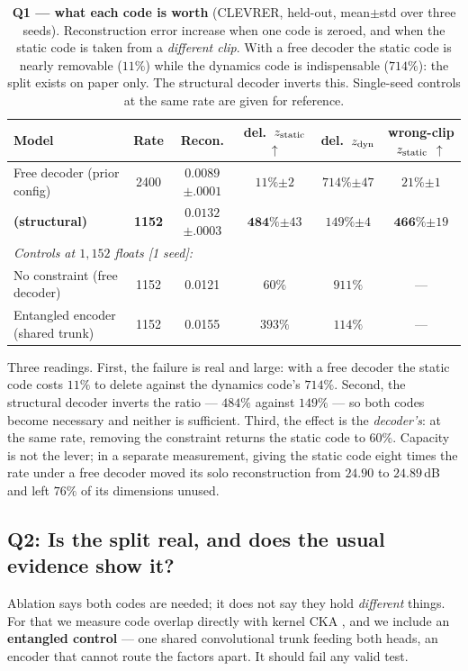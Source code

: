 \begin{table}[t]
\centering\small
\caption{\textbf{Q1 --- what each code is worth} (CLEVRER, held-out, mean$\pm$std over
three seeds). Reconstruction error increase when one code is zeroed, and when the static
code is taken from a \emph{different clip}. With a free decoder the static code is
nearly removable ($11\%$) while the dynamics code is indispensable ($714\%$): the split
exists on paper only. The structural decoder inverts this. Single-seed controls at the
same rate are given for reference.}
\label{tab:ablate}
\begin{tabular}{lccccc}
\toprule
Model & Rate & Recon. & del.\ $z_{\mathrm{static}}$ $\uparrow$ & del.\ $z_{\mathrm{dyn}}$ & wrong-clip $z_{\mathrm{static}}$ $\uparrow$ \\
\midrule
Free decoder (prior config) & 2400 & $0.0089${\tiny$\pm.0001$} & $11\%${\tiny$\pm2$} & $714\%${\tiny$\pm47$} & $21\%${\tiny$\pm1$} \\
\textbf{\method{} (structural)} & \textbf{1152} & $0.0132${\tiny$\pm.0003$} & $\mathbf{484\%}${\tiny$\pm43$} & $149\%${\tiny$\pm4$} & $\mathbf{466\%}${\tiny$\pm19$} \\
\midrule
\multicolumn{6}{l}{\emph{Controls at $1{,}152$ floats [1 seed]:}} \\
No constraint (free decoder) & 1152 & 0.0121 & $60\%$ & $911\%$ & --- \\
Entangled encoder (shared trunk) & 1152 & 0.0155 & $393\%$ & $114\%$ & --- \\
\bottomrule
\end{tabular}
\end{table}

Three readings. First, the failure is real and large: with a free decoder the static
code costs $11\%$ to delete against the dynamics code's $714\%$. Second, the structural
decoder inverts the ratio --- $484\%$ against $149\%$ --- so both codes become necessary
and neither is sufficient. Third, the effect is the \emph{decoder's}: at the same rate,
removing the constraint returns the static code to $60\%$. Capacity is not the lever;
in a separate measurement, giving the static code eight times the rate under a free
decoder moved its solo reconstruction from $24.90$ to $24.89$\,dB and left $76\%$ of
its dimensions unused.

\subsection{Q2: Is the split real, and does the usual evidence show it?}
\label{sec:q2}
Ablation says both codes are needed; it does not say they hold \emph{different} things.
For that we measure code overlap directly with kernel CKA \citep{cka}, and we include an
\textbf{entangled control} --- one shared convolutional trunk feeding both heads, an
encoder that cannot route the factors apart. It should fail any valid test.


